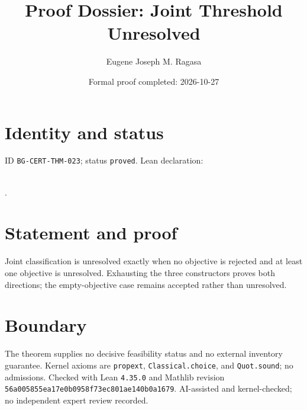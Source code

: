 \documentclass[11pt]{article}
\title{Proof Dossier: Joint Threshold Unresolved}\author{Eugene Joseph M. Ragasa}\date{Formal proof completed: 2026-10-27}
\begin{document}
\maketitle
\section{Identity and status}
ID \texttt{BG-CERT-THM-023}; status \texttt{proved}. Lean declaration:
\par{}\\
{\tiny{}}.
\section{Statement and proof}
Joint classification is unresolved exactly when no objective is rejected and at least one
objective is unresolved. Exhausting the three constructors proves both directions; the
empty-objective case remains accepted rather than unresolved.
\section{Boundary}
The theorem supplies no decisive feasibility status and no external inventory guarantee.
Kernel axioms are \texttt{propext}, \texttt{Classical.choice}, and \texttt{Quot.sound};
no admissions. Checked with Lean \texttt{4.35.0} and Mathlib revision
\texttt{56a005855ea17e0b0958f73ec801ae140b0a1679}. AI-assisted and kernel-checked;
no independent expert review recorded.
\end{document}
